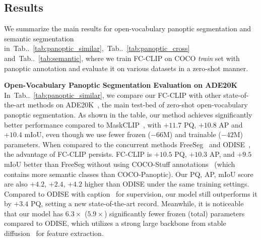\documentclass{article}
\makeatletter
\DeclareRobustCommand\onedot{\futurelet\@let@token\@onedot}
\def\@onedot{\ifx\@let@token.\else.\null\fi\xspace}
\newcommand{\tabref}[1]{Tab\onedot~\ref{#1}}
\newcommand{\modelname}{FC-CLIP\xspace}
\makeatother
\begin{document}
\subsection{Results}
\label{sec:main_results}
We summarize the main results for open-vocabulary panoptic segmentation and semantic segmentation in~\tabref{tab:panoptic_similar},~\tabref{tab:panoptic_cross} and~\tabref{tab:semantic}, where we train \modelname on COCO \textit{train} set with panoptic annotation and evaluate it on various datasets in a zero-shot manner.

\noindent \textbf{Open-Vocabulary Panoptic Segmentation Evaluation on ADE20K}\quad
In~\tabref{tab:panoptic_similar}, we compare our \modelname with other state-of-the-art methods on ADE20K~\cite{zhou2017scene}, the main test-bed of zero-shot open-vocabulary panoptic segmentation.
As shown in the table, our method achieves significantly better performance compared to MaskCLIP~\cite{ding2022open}, with $+11.7$ PQ, $+10.8$ AP and $+10.4$ mIoU, even though we use fewer frozen ($-66$M) and trainable ($-42$M) parameters.
When compared to the concurrent methods FreeSeg~\cite{qin2023freeseg} and ODISE~\cite{xu2023open}, the advantage of \modelname persists.
\modelname is $+10.5$ PQ, $+10.3$ AP, and $+9.5$ mIoU better than FreeSeg without using COCO-Stuff annotations~\cite{caesar2018coco} (which contains more semantic classes than COCO-Panoptic).
Our PQ, AP, mIoU score are also $+4.2$, $+2.4$, $+4.2$ higher than ODISE under the same training settings.
Compared to ODISE with caption~\cite{chen2015microsoft} for supervision, our model still outperforms it by $+3.4$ PQ, setting a new state-of-the-art record. Meanwhile, it is noticeable that our model has $6.3\times$ ($5.9\times$) significantly fewer frozen (total) parameters compared to ODISE, which utilizes a strong large backbone from stable diffusion~\cite{rombach2022high} for feature extraction.
\end{document}
